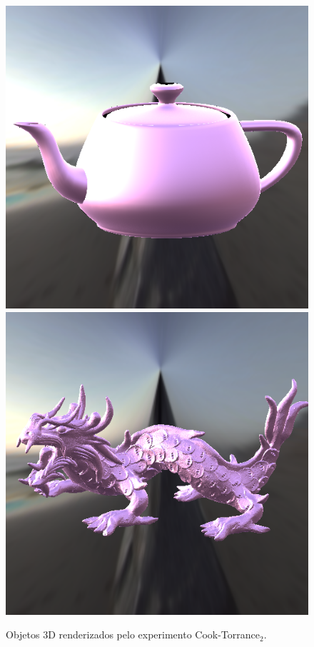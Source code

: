 \begin{figure}[H]
    \caption{\small{Objetos 3D renderizados pelo experimento Cook-Torrance$_2$.}}\label{fig-cook-torrance-alternative-eqlang}
  \includegraphics[width=\linewidth]{./Imagens/brdfs/cook-torrance-alternative-teapot.png}
\endminipage\hfill
{}
  \includegraphics[width=\linewidth]{./Imagens/brdfs/cook-torrance-alternative-dragon.png}

\end{figure}
